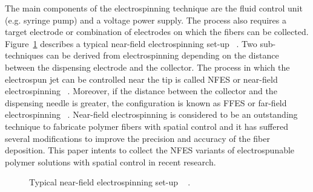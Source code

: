 \documentclass[3p,,preprint,12pt]{elsarticle}
\makeatletter
\def\fixFloatSize#1{}%
\makeatother
\begin{document}
The main components of the electrospinning technique are the fluid control unit (e.g. syringe pump) and a voltage power supply. The process also requires a target electrode or combination of electrodes on which the fibers can be collected.  Figure~\ref{f-fe28447572e9} describes a typical near-field electrospinning set-up \unskip~\cite{527120:12073538}. Two sub-techniques can be derived from electrospinning depending on the distance between the dispensing electrode and the collector. The process in which the electrospun jet can be controlled near the tip is called NFES or near-field electrospinning \unskip~\cite{527120:12033655}. Moreover, if the distance between the collector and the dispensing needle is greater, the configuration is known as FFES or far-field electrospinning \unskip~\cite{527120:12073581}. Near-field electrospinning is considered to be an outstanding technique to fabricate polymer fibers with spatial control and it has suffered several modifications to improve the precision and accuracy of the fiber deposition. This paper intents to collect the NFES variants of electrospunable polymer solutions with spatial control in recent research.


\bgroup
\fixFloatSize{images/596d6818-a246-493e-bea0-03f815ab8ff8-unfes.jpg}
\begin{figure}[!htbp]
\centering \makeatletter{}
\makeatother 
\caption{{Typical near-field electrospinning set-up \unskip~\protect\cite{527120:11973130} .}}
\label{f-fe28447572e9}
\end{figure}
\egroup
\end{document}
